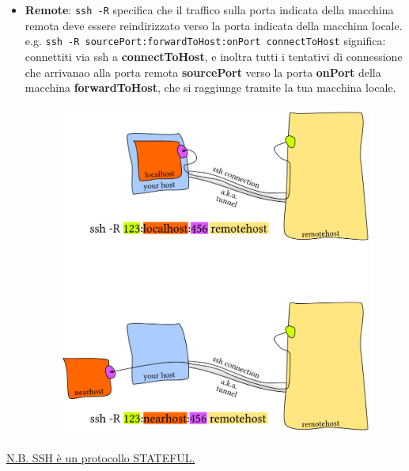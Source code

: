 \documentclass[11pt,a4paper]{article}
\theoremstyle{definition}
\begin{document}
\begin{itemize}
\begin{figure}[!h]
		      \centering
	      \end{figure}
	      \newpage
	\item \textbf{Remote}: \texttt{ssh -R} specifica che il traffico sulla porta indicata della macchina remota deve essere reindirizzato verso la porta indicata della macchina locale.\newline
	      e.g. \texttt{ssh -R sourcePort:forwardToHost:onPort connectToHost} significa: connettiti via ssh a \textbf{connectToHost}, e inoltra tutti i tentativi di connessione che arrivanao alla porta remota \textbf{sourcePort} verso la porta \textbf{onPort} della macchina \textbf{forwardToHost}, che si raggiunge tramite la tua macchina locale.
	      \begin{figure}[!h]
		      \includegraphics[scale=0.9]{Immagini/Remote_ssh.png}
		      \centering
	      \end{figure}
\end{itemize}
\underline{N.B. SSH è un protocollo STATEFUL.}
\newpage
\end{document}
